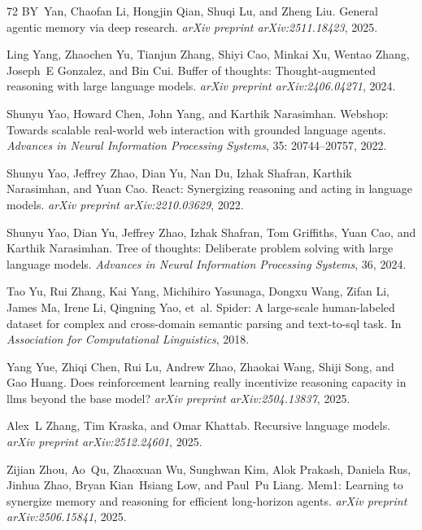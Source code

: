 \begin{thebibliography}{72}
BY~Yan, Chaofan Li, Hongjin Qian, Shuqi Lu, and Zheng Liu.
\newblock General agentic memory via deep research.
\newblock \emph{arXiv preprint arXiv:2511.18423}, 2025.

Ling Yang, Zhaochen Yu, Tianjun Zhang, Shiyi Cao, Minkai Xu, Wentao Zhang, Joseph~E Gonzalez, and Bin Cui.
\newblock Buffer of thoughts: Thought-augmented reasoning with large language models.
\newblock \emph{arXiv preprint arXiv:2406.04271}, 2024.

Shunyu Yao, Howard Chen, John Yang, and Karthik Narasimhan.
\newblock Webshop: Towards scalable real-world web interaction with grounded language agents.
\newblock \emph{Advances in Neural Information Processing Systems}, 35: 20744--20757, 2022{}.

Shunyu Yao, Jeffrey Zhao, Dian Yu, Nan Du, Izhak Shafran, Karthik Narasimhan, and Yuan Cao.
\newblock React: Synergizing reasoning and acting in language models.
\newblock \emph{arXiv preprint arXiv:2210.03629}, 2022{}.

Shunyu Yao, Dian Yu, Jeffrey Zhao, Izhak Shafran, Tom Griffiths, Yuan Cao, and Karthik Narasimhan.
\newblock Tree of thoughts: Deliberate problem solving with large language models.
\newblock \emph{Advances in Neural Information Processing Systems}, 36, 2024.

Tao Yu, Rui Zhang, Kai Yang, Michihiro Yasunaga, Dongxu Wang, Zifan Li, James Ma, Irene Li, Qingning Yao, et~al.
\newblock Spider: A large-scale human-labeled dataset for complex and cross-domain semantic parsing and text-to-sql task.
\newblock In \emph{Association for Computational Linguistics}, 2018.

Yang Yue, Zhiqi Chen, Rui Lu, Andrew Zhao, Zhaokai Wang, Shiji Song, and Gao Huang.
\newblock Does reinforcement learning really incentivize reasoning capacity in llms beyond the base model?
\newblock \emph{arXiv preprint arXiv:2504.13837}, 2025.

Alex~L Zhang, Tim Kraska, and Omar Khattab.
\newblock Recursive language models.
\newblock \emph{arXiv preprint arXiv:2512.24601}, 2025.

Zijian Zhou, Ao~Qu, Zhaoxuan Wu, Sunghwan Kim, Alok Prakash, Daniela Rus, Jinhua Zhao, Bryan Kian~Hsiang Low, and Paul~Pu Liang.
\newblock Mem1: Learning to synergize memory and reasoning for efficient long-horizon agents.
\newblock \emph{arXiv preprint arXiv:2506.15841}, 2025.

\end{thebibliography}
